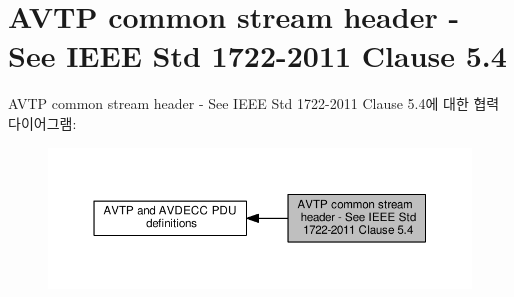 \hypertarget{group__jdksavdecc__avtp__common__stream__header}{}\section{A\+V\+TP common stream header -\/ See I\+E\+EE Std 1722-\/2011 Clause 5.4}
\label{group__jdksavdecc__avtp__common__stream__header}
A\+V\+TP common stream header -\/ See I\+E\+EE Std 1722-\/2011 Clause 5.4에 대한 협력 다이어그램\+:
\nopagebreak
\begin{figure}[H]
\begin{center}
\leavevmode
\includegraphics[width=350pt]{group__jdksavdecc__avtp__common__stream__header}
\end{center}
\end{figure}

